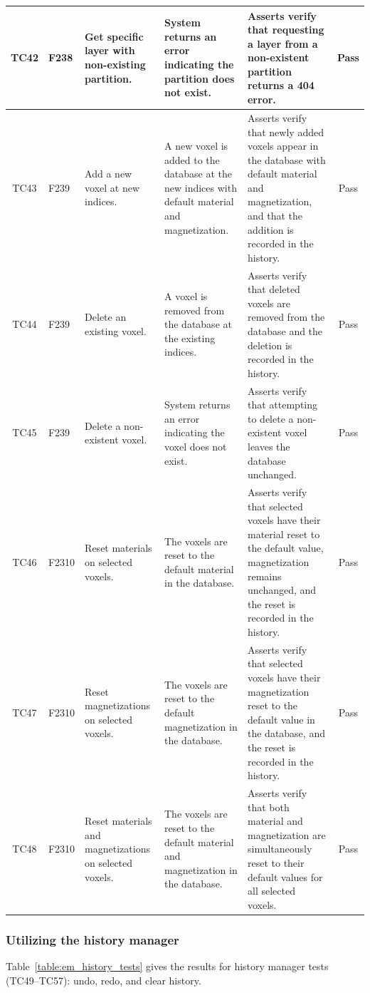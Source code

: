 \documentclass[12pt, titlepage]{article}
\begin{document}
\begin{longtable}{c
    >{\raggedright\arraybackslash}p{1.5cm}
    >{\raggedright\arraybackslash}p{3cm}
    >{\raggedright\arraybackslash}p{3cm}
  >{\raggedright\arraybackslash}p{4.5cm} c}
  TC42 & F238 & Get specific layer with non-existing partition. & System returns an error indicating the partition does not exist. & Asserts verify that requesting a layer from a non-existent partition returns a 404 error. & \cellcolor{green} Pass \\ \midrule
  TC43 & F239 & Add a new voxel at new indices. & A new voxel is added to the database at the new indices with default material and magnetization. & Asserts verify that newly added voxels appear in the database with default material and magnetization, and that the addition is recorded in the history. & \cellcolor{green} Pass \\ \midrule
  TC44 & F239 & Delete an existing voxel. & A voxel is removed from the database at the existing indices. & Asserts verify that deleted voxels are removed from the database and the deletion is recorded in the history. & \cellcolor{green} Pass \\ \midrule
  TC45 & F239 & Delete a non-existent voxel. & System returns an error indicating the voxel does not exist. & Asserts verify that attempting to delete a non-existent voxel leaves the database unchanged. & \cellcolor{green} Pass \\ \midrule
  TC46 & F2310 & Reset materials on selected voxels. & The voxels are reset to the default material in the database. & Asserts verify that selected voxels have their material reset to the default value, magnetization remains unchanged, and the reset is recorded in the history. & \cellcolor{green} Pass \\ \midrule
  TC47 & F2310 & Reset magnetizations on selected voxels. & The voxels are reset to the default magnetization in the database. & Asserts verify that selected voxels have their magnetization reset to the default value in the database, and the reset is recorded in the history. & \cellcolor{green} Pass \\ \midrule
  TC48 & F2310 & Reset materials and magnetizations on selected voxels. & The voxels are reset to the default material and magnetization in the database. & Asserts verify that both material and magnetization are simultaneously reset to their default values for all selected voxels. & \cellcolor{green} Pass \\
\end{longtable}

\subsubsection{Utilizing the history manager}
Table~\ref{table:em_history_tests} gives the results for history manager tests (TC49--TC57): undo, redo, and clear history.
\end{document}
